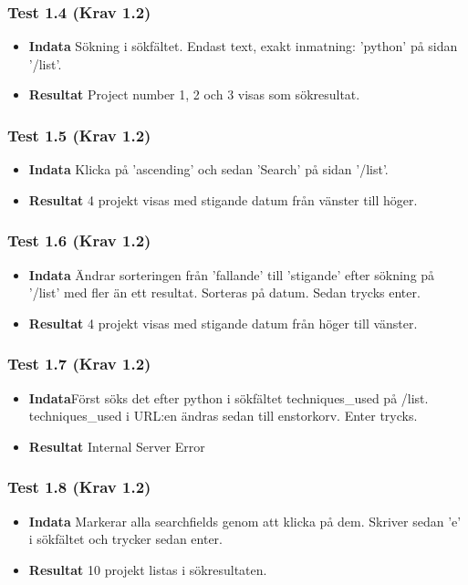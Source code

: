 \documentclass{TDP003mall}
\begin{document}
\subsubsection*{Test 1.4 (Krav 1.2)}
\begin{itemize}
\item[]\textbf{Indata} Sökning i sökfältet. Endast text, exakt inmatning: 'python' på sidan '/list'.
\item[]\textbf{Resultat} Project number 1, 2 och 3 visas som sökresultat.
\end{itemize}
\subsubsection*{Test 1.5 (Krav 1.2)}
\begin{itemize}
\item[]\textbf{Indata} Klicka på 'ascending' och sedan 'Search' på sidan '/list'.
\item[]\textbf{Resultat} 4 projekt visas med stigande datum från vänster till höger.
\end{itemize}
\subsubsection*{Test 1.6 (Krav 1.2)}
\begin{itemize}
\item[]\textbf{Indata} Ändrar sorteringen från 'fallande' till 'stigande' efter sökning på '/list' med fler än ett resultat. Sorteras på datum. Sedan trycks enter.
\item[]\textbf{Resultat} 4 projekt visas med stigande datum från höger till vänster.
\end{itemize}
\subsubsection*{Test 1.7 (Krav 1.2)}
\begin{itemize}
\item[]\textbf{Indata}Först söks det efter python i sökfältet techniques\_used på /list. techniques\_used i URL:en ändras sedan till enstorkorv. Enter trycks.
\item[]\textbf{Resultat} Internal Server Error
\end{itemize}
\subsubsection*{Test 1.8 (Krav 1.2)}
\begin{itemize}
\item[]\textbf{Indata} Markerar alla searchfields genom att klicka på dem. Skriver sedan 'e' i sökfältet och trycker sedan enter.
\item[]\textbf{Resultat} 10 projekt listas i sökresultaten.
\end{itemize}
\end{document}
